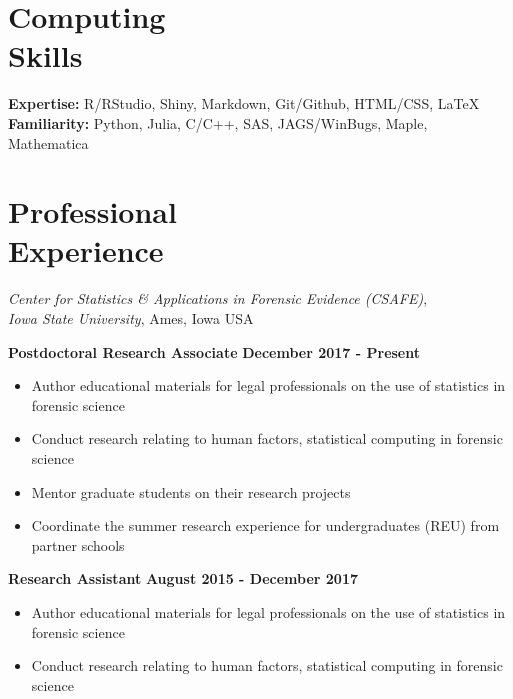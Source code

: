 \documentclass[margin,line]{res}
\begin{document}
\begin{resume}
%

\section{\sc Computing \\ Skills} 

\textbf{Expertise:} R/RStudio, Shiny, Markdown,  Git/Github, HTML/CSS,  \LaTeX \\
\textbf{Familiarity:} Python, Julia, C/C++, SAS, JAGS/WinBugs, Maple, Mathematica

\vspace{-.2cm}


\section{\sc Professional \\ Experience}
{\em Center for Statistics \& Applications in Forensic Evidence (CSAFE)}, \\
{\em Iowa State University}, Ames, Iowa USA

\vspace{-.3cm}

{\bf Postdoctoral Research Associate } \hfill {\bf December 2017 - Present}\\
\vspace{-.3cm}
\begin{itemize}
\setlength\itemsep{0em}
\item Author educational materials for legal professionals on the use of statistics in forensic science
\item Conduct research relating to human factors, statistical computing in forensic science
\item Mentor graduate students on their research projects
\item Coordinate the summer research experience for undergraduates (REU) from partner schools
\end{itemize} 
\vspace{-.3cm}

{\bf Research Assistant} \hfill {\bf August 2015 - December 2017}\\
\vspace{-.3cm}
\begin{itemize}
\setlength\itemsep{0em}
\item Author educational materials for legal professionals on the use of statistics in forensic science
\item Conduct research relating to human factors, statistical computing in forensic science
\end{itemize} 


\end{resume}
\end{document}
